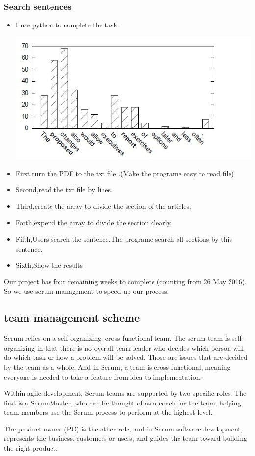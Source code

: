 \subsubsection*{Search sentences}
\begin{itemize}
	\item I use python to complete the task. 
	\begin{center}
		\includegraphics[width=0.8\columnwidth]{Union_Background_Chart_2}
	\end{center}
	\item First,turn the PDF to the txt file .(Make the programe easy to read file)\\ 
	\item Second,read the txt file by lines.\\ 	
	\item Third,create the array to divide the section of the articles.\\ 	
	\item Forth,expend the array to divide the section clearly.\\ 	
	\item Fifth,Users search the sentence.The programe search all sections by this sentence.\\
	\item Sixth,Show the results\\  		
	
\end{itemize}
Our project has four remaining weeks to complete (counting from 26 May 2016). 
So we use scrum management to speed up our process.
\subsection{team management scheme}
Scrum relies on a self-organizing, cross-functional team. 
The scrum team is self-organizing in that there is no overall team leader who decides which person will do which task or how a problem will be solved. 
Those are issues that are decided by the team as a whole.
And in Scrum, a team is cross functional, meaning everyone is needed to take a feature from idea to implementation.

Within agile development, Scrum teams are supported by two specific roles. 
The first is a ScrumMaster, who can be thought of as a coach for the team, helping team members use the Scrum process to perform at the highest level.

The product owner (PO) is the other role, and in Scrum software development, represents the business, customers or users, and guides the team toward building the right product.\\
\newpage %